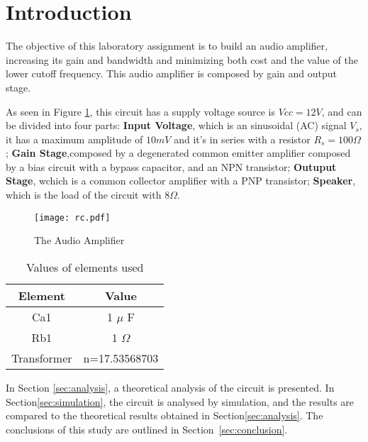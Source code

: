 \section{Introduction}
\label{sec:introduction}

The objective of this laboratory assignment is to build an audio amplifier, increasing its gain and bandwidth and minimizing both cost and the value of the lower cutoff frequency. This audio amplifier is composed by gain and output stage.

As seen in Figure \ref{fig:rc}, this circuit has a supply voltage source is $Vcc=12 V$, and can be divided into four parts: \textbf{Input Voltage}, which is an sinusoidal (AC) signal $V_s$, it has a maximum amplitude of $10 mV$ and it's in series with a resistor $R_s=100 \Omega$; \textbf{Gain Stage},composed by a degenerated common emitter amplifier composed by a bias circuit with a bypass capacitor, and an NPN transistor; \textbf{Outuput Stage}, wchich is a common collector amplifier with a PNP transistor; \textbf{Speaker}, which is the load of the circuit with $8 \Omega$.


\begin{figure}[h] \centering
\texttt{[image: rc.pdf]}
\vspace{-5mm}
\caption{The Audio Amplifier}
\label{fig:rc}
\end{figure}


\begin{table}[h]
  \centering
  \begin{tabular}{|c|c|}
    \hline    
    Element &  Value \\ \hline
    Ca1 & 1 $\mu$ F \\ \hline
    Rb1 & 1 $\Omega$ \\ \hline
    Transformer & n=17.53568703 \\ \hline
    
 \end{tabular}
 \caption{Values of elements used}
  \label{tab:op2}
\end{table}

In Section \ref{sec:analysis}, a theoretical analysis of the circuit is presented. In Section\ref{sec:simulation}, the circuit is analysed by simulation, and the results are compared to the theoretical results obtained in Section\ref{sec:analysis}. The conclusions of this study are outlined in Section~\ref{sec:conclusion}.





